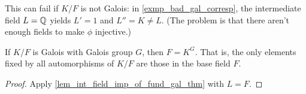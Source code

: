 \begin{remark}
    This can fail if $K/F$ is not Galois: in \cref{exmp_bad_gal_corresp}, the intermediate field $L = \mathbb{{Q}}$ yields $L' = 1$ and $L'' = K \neq L$. (The problem is that there aren't enough fields to make $\phi$ injective.)
\end{remark}

\begin{corollary}
    If $K/F$ is Galois with Galois group $G$, then $F = K^G$. That is, the only elements fixed by all automorphisms of $K/F$ are those in the base field $F$.
\end{corollary}

\begin{proof}
    Apply \cref{lem_int_field_imp_of_fund_gal_thm} with $L = F$.
\end{proof}

